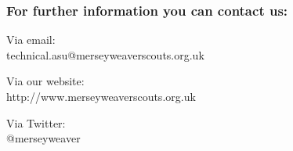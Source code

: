 \null
\vfill
\subsubsection{For further information you can contact us:}
Via email:\\
technical.asu@merseyweaverscouts.org.uk

Via our website:\\
http://www.merseyweaverscouts.org.uk

Via Twitter:\\
@merseyweaver
\newpage